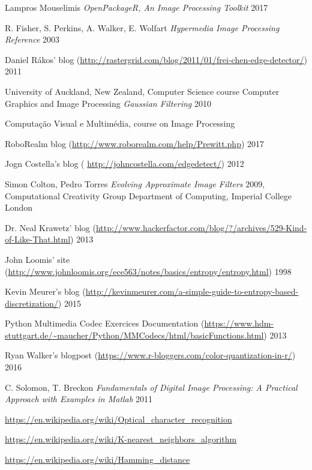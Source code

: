 \documentclass[12pt]{article}
\begin{document}
\newpage

\begin{thebibliography}{1}

 Lampros Mouselimis {\em OpenPackageR, An Image Processing Toolkit} 2017

 R. Fisher, S. Perkins, A. Walker, E. Wolfart {\em Hypermedia Image Processing Reference} 2003

 Daniel R\'akos' blog (\url{http://rastergrid.com/blog/2011/01/frei-chen-edge-detector/}) 2011

 University of Auckland, New Zealand, Computer Science course Computer Graphics and Image Processing {\em Gaussian Filtering} 2010

 Computaç\~ao Visual e Multimédia, course on Image Processing

 RoboRealm blog (\url{http://www.roborealm.com/help/Prewitt.php}) 2017

 Jogn Costella's blog ( \url{http://johncostella.com/edgedetect/}) 2012

 Simon Colton, Pedro Torres {\em Evolving Approximate Image Filters} 2009, Computational Creativity Group
Department of Computing, Imperial College London

 Dr. Neal Krawetz' blog (\url{http://www.hackerfactor.com/blog/?/archives/529-Kind-of-Like-That.html}) 2013

 John Loomis' site (\url{http://www.johnloomis.org/ece563/notes/basics/entropy/entropy.html}) 1998

 Kevin Meurer's blog (\url{http://kevinmeurer.com/a-simple-guide-to-entropy-based-discretization/}) 2015

 Python Multimedia Codec Exercices Documentation (\url{https://www.hdm-stuttgart.de/~maucher/Python/MMCodecs/html/basicFunctions.html}) 2013

 Ryan Walker's blogpost (\url{https://www.r-bloggers.com/color-quantization-in-r/}) 2016

 C. Solomon, T. Breckon {\em Fundamentals of Digital Image Processing: A Practical Approach with Examples in Matlab} 2011

 \url{https://en.wikipedia.org/wiki/Optical_character_recognition}

 \url{https://en.wikipedia.org/wiki/K-nearest_neighbors_algorithm}

 \url{https://en.wikipedia.org/wiki/Hamming_distance}
\end{thebibliography}
\end{document}
